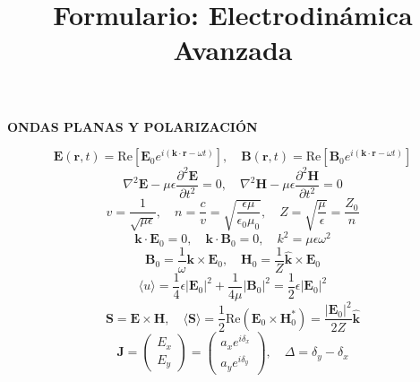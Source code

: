 \documentclass[twocolumn]{article}
\title{\vspace{-4ex}\textbf{Formulario: Electrodinámica Avanzada}\vspace{-4ex}}
\author{\vspace{-5ex}}
\date{\vspace{-5ex}}
\begin{document}
	\maketitle
	
	\begin{center}\textbf{\footnotesize ONDAS PLANAS Y POLARIZACIÓN}\end{center}
	\vspace{-2mm}
	\begin{equation*}
		\mathbf{E}(\mathbf{r},t) = \text{Re}\left[\mathbf{E}_0 e^{i(\mathbf{k}\cdot\mathbf{r} - \omega t)}\right], \quad \mathbf{B}(\mathbf{r},t) = \text{Re}\left[\mathbf{B}_0 e^{i(\mathbf{k}\cdot\mathbf{r} - \omega t)}\right]
	\end{equation*}
	\begin{equation*}
		\nabla^2\mathbf{E} - \mu\epsilon \frac{\partial^2\mathbf{E}}{\partial t^2} = 0, \quad \nabla^2\mathbf{H} - \mu\epsilon \frac{\partial^2\mathbf{H}}{\partial t^2} = 0
	\end{equation*}
	\begin{equation*}
		v = \frac{1}{\sqrt{\mu\epsilon}}, \quad n = \frac{c}{v} = \sqrt{\frac{\epsilon\mu}{\epsilon_0\mu_0}}, \quad Z = \sqrt{\frac{\mu}{\epsilon}} = \frac{Z_0}{n}
	\end{equation*}
	\begin{equation*}
		\mathbf{k}\cdot\mathbf{E}_0 = 0, \quad \mathbf{k}\cdot\mathbf{B}_0 = 0, \quad k^2 = \mu\epsilon\omega^2
	\end{equation*}
	\begin{equation*}
		\mathbf{B}_0 = \frac{1}{\omega}\mathbf{k}\times\mathbf{E}_0, \quad \mathbf{H}_0 = \frac{1}{Z}\hat{\mathbf{k}}\times\mathbf{E}_0
	\end{equation*}
	\begin{equation*}
		\langle u \rangle = \frac{1}{4}\epsilon |\mathbf{E}_0|^2 + \frac{1}{4\mu}|\mathbf{B}_0|^2 = \frac{1}{2}\epsilon |\mathbf{E}_0|^2
	\end{equation*}
	\begin{equation*}
		\mathbf{S} = \mathbf{E}\times\mathbf{H}, \quad \langle\mathbf{S}\rangle = \frac{1}{2}\text{Re}(\mathbf{E}_0\times\mathbf{H}_0^*) = \frac{|\mathbf{E}_0|^2}{2Z}\hat{\mathbf{k}}
	\end{equation*}
	\begin{equation*}
		\mathbf{J} = \begin{pmatrix} E_x \\ E_y \end{pmatrix} = \begin{pmatrix} a_x e^{i\delta_x} \\ a_y e^{i\delta_y} \end{pmatrix}, \quad \Delta = \delta_y - \delta_x
	\end{equation*}
\end{document}
